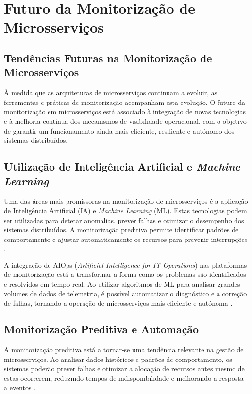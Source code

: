 \section{Futuro da Monitorização de Microsserviços}

\subsection{Tendências Futuras na Monitorização de Microsserviços}

À medida que as arquiteturas de microsserviços continuam a evoluir, as ferramentas e práticas de monitorização acompanham esta evolução. O futuro da monitorização em microsserviços está associado à integração de novas tecnologias e à melhoria contínua dos mecanismos de visibilidade operacional, com o objetivo de garantir um funcionamento ainda mais eficiente, resiliente e autónomo dos sistemas distribuídos.

\subsection{Utilização de Inteligência Artificial e \textit{Machine Learning}}

Uma das áreas mais promissoras na monitorização de microsserviços é a aplicação de Inteligência Artificial (IA) e \textit{Machine Learning} (ML). Estas tecnologias podem ser utilizadas para detetar anomalias, prever falhas e otimizar o desempenho dos sistemas distribuídos. A monitorização preditiva permite identificar padrões de comportamento e ajustar automaticamente os recursos para prevenir interrupções \cite{Khan2022}.

A integração de AIOps (\textit{Artificial Intelligence for IT Operations}) nas plataformas de monitorização está a transformar a forma como os problemas são identificados e resolvidos em tempo real. Ao utilizar algoritmos de ML para analisar grandes volumes de dados de telemetria, é possível automatizar o diagnóstico e a correção de falhas, tornando a operação de microsserviços mais eficiente e autónoma \cite{Khan2022}.

\subsection{Monitorização Preditiva e Automação}

A monitorização preditiva está a tornar-se uma tendência relevante na gestão de microsserviços. Ao analisar dados históricos e padrões de comportamento, os sistemas poderão prever falhas e otimizar a alocação de recursos antes mesmo de estas ocorrerem, reduzindo tempos de indisponibilidade e melhorando a resposta a eventos \cite{Kusuma2022}.

